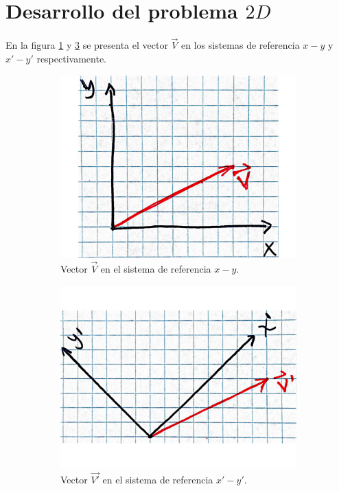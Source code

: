 \documentclass[12pt,letterpaper]{article}
\begin{document}
\section{Desarrollo del problema $2D$}
%
En la figura \ref{vector1} y \ref{vector2} se presenta el vector $\overset{\rightarrow}{V}$ en los sistemas de referencia $x-y$ y $x'-y'$ respectivamente.\\
%
%
\begin{figure}[h]
	\centering
	\begin{subfigure}[l]{0.450\textwidth}
		\includegraphics[width=\textwidth]{img/Vector1.pdf}
		\caption{Vector $\overset{\rightarrow}{V}$ en el sistema de referencia $x-y$.}
		\label{vector1}
	\end{subfigure}
	\hspace{.5 cm}
	\begin{subfigure}[r]{0.450\textwidth}
		\includegraphics[width=\textwidth]{img/Vector2.pdf}
		\caption{Vector $\overset{\rightarrow}{V'}$ en el sistema de referencia $x'-y'$.}
		\label{vector2}
	\end{subfigure}	
	\caption{}
\end{figure}
\end{document}
